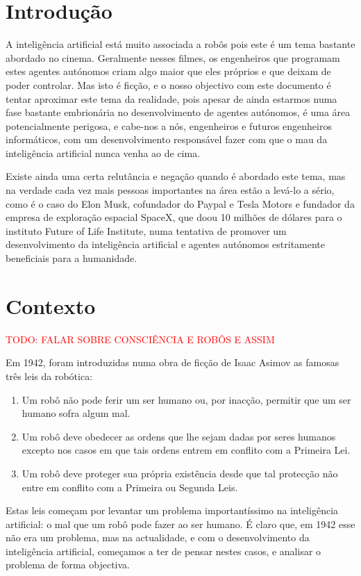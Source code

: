 \documentclass[runningheads,a4paper]{llncs}
\begin{document}
\section{Introdução}

A inteligência artificial está muito associada a robôs pois este é um tema bastante abordado no cinema. Geralmente nesses filmes, os engenheiros que programam estes agentes autónomos criam algo maior que eles próprios e que deixam de poder controlar. Mas isto é ficção, e o nosso objectivo com este documento é tentar aproximar este tema da realidade, pois apesar de ainda estarmos numa fase bastante embrionária no desenvolvimento de agentes autónomos, é uma área potencialmente perigosa, e cabe-nos a nós, engenheiros e futuros engenheiros informáticos, com um desenvolvimento responsável fazer com que o mau da inteligência artificial nunca venha ao de cima.

Existe ainda uma certa relutância e negação quando é abordado este tema, mas na verdade cada vez mais pessoas importantes na área estão a levá-lo a sério, como é o caso do Elon Musk, cofundador do Paypal e Tesla Motors e fundador da empresa de exploração espacial SpaceX, que doou 10 milhões de dólares para o instituto Future of Life Institute, numa tentativa de promover um desenvolvimento da inteligência artificial e agentes autónomos estritamente beneficiais para a humanidade.

\section{Contexto}

\textcolor{red}{TODO\@: FALAR SOBRE CONSCIÊNCIA E ROBÔS E ASSIM}

Em 1942, foram introduzidas numa obra de ficção de Isaac Asimov as famosas três leis da robótica:

\begin{enumerate}
    \item Um robô não pode ferir um ser humano ou, por inacção, permitir que um ser humano sofra algum mal.
    \item Um robô deve obedecer as ordens que lhe sejam dadas por seres humanos excepto nos casos em que tais ordens entrem em conflito com a Primeira Lei.
    \item Um robô deve proteger sua própria existência desde que tal protecção não entre em conflito com a Primeira ou Segunda Leis.
\end{enumerate}

Estas leis começam por levantar um problema importantíssimo na inteligência artificial: o mal que um robô pode fazer ao ser humano. É claro que, em 1942 esse não era um problema, mas na actualidade, e com o desenvolvimento da inteligência artificial, começamos a ter de pensar nestes casos, e analisar o problema de forma objectiva.
\end{document}
